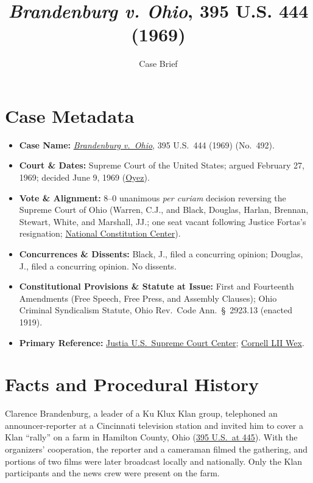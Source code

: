 \documentclass[12pt]{article}
\title{\textit{Brandenburg v. Ohio}, 395 U.S. 444 (1969)}
\author{Case Brief}
\date{}
\begin{document}
\maketitle

\section{Case Metadata}

\begin{itemize}
  \item \textbf{Case Name:} \href{https://supreme.justia.com/cases/federal/us/395/444/}{\emph{Brandenburg v.\ Ohio}}, 395 U.S.\ 444 (1969) (No.\ 492).
  \item \textbf{Court \& Dates:} Supreme Court of the United States; argued February 27, 1969; decided June 9, 1969 (\href{https://www.oyez.org/cases/1968/492}{Oyez}).
  \item \textbf{Vote \& Alignment:} 8--0 unanimous \emph{per curiam} decision reversing the Supreme Court of Ohio (Warren, C.J., and Black, Douglas, Harlan, Brennan, Stewart, White, and Marshall, JJ.; one seat vacant following Justice Fortas's resignation; \href{https://constitutioncenter.org/the-constitution/supreme-court-case-library/brandenburg-v-ohio}{National Constitution Center}).
  \item \textbf{Concurrences \& Dissents:} Black, J., filed a concurring opinion; Douglas, J., filed a concurring opinion. No dissents.
  \item \textbf{Constitutional Provisions \& Statute at Issue:} First and Fourteenth Amendments (Free Speech, Free Press, and Assembly Clauses); Ohio Criminal Syndicalism Statute, Ohio Rev.\ Code Ann.\ \S~2923.13 (enacted 1919).
  \item \textbf{Primary Reference:} \href{https://supreme.justia.com/cases/federal/us/395/444/}{Justia U.S.\ Supreme Court Center}; \href{https://www.law.cornell.edu/wex/brandenburg_test}{Cornell LII Wex}.
\end{itemize}

\section{Facts and Procedural History}

Clarence Brandenburg, a leader of a Ku Klux Klan group, telephoned an announcer-reporter at a Cincinnati television station and invited him to cover a Klan ``rally'' on a farm in Hamilton County, Ohio (\href{https://supreme.justia.com/cases/federal/us/395/444/}{395 U.S.\ at 445}). With the organizers' cooperation, the reporter and a cameraman filmed the gathering, and portions of two films were later broadcast locally and nationally. Only the Klan participants and the news crew were present on the farm.
\end{document}
